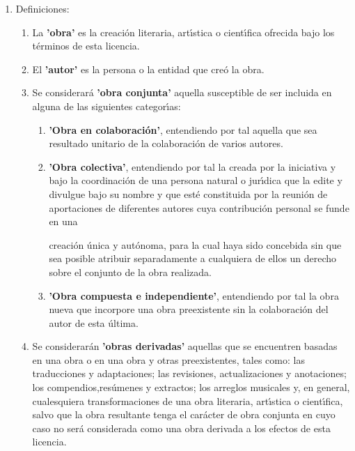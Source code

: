 \begin{enumerate}

\item Definiciones:

  \begin{enumerate}

  \item La \textbf{'obra'} es la creaci\'on literaria, art\'\i{}stica
    o cient\'\i{}fica ofrecida bajo los t\'erminos de esta licencia.

  \item El \textbf{'autor'} es la persona o la entidad que cre\'o la
    obra.

  \item Se considerar\'a \textbf{'obra conjunta'} aquella susceptible
    de ser incluida en alguna de las siguientes categor\'\i{}as:

    \begin{enumerate}

    \item \textbf{'Obra en colaboraci\'on'}, entendiendo por tal
      aquella que sea resultado unitario de la colaboraci\'on de
      varios autores.

    \item \textbf{'Obra colectiva'}, entendiendo por tal la creada por
      la iniciativa y bajo la coordinaci\'on de una persona natural o
      jur\'\i{}dica que la edite y divulgue bajo su nombre y que
      est\'e constituida por la reuni\'on de aportaciones de
      diferentes autores cuya contribuci\'on personal se funde en una

      creaci\'on \'unica y aut\'onoma, para la cual haya sido
      concebida sin que sea posible atribuir separadamente a
      cualquiera de ellos un derecho sobre el conjunto de la obra
      realizada.

    \item \textbf{'Obra compuesta e independiente'}, entendiendo por
      tal la obra nueva que incorpore una obra preexistente sin la
      colaboraci\'on del autor de esta \'ultima.

    \end{enumerate}

  \item Se considerar\'an \textbf{'obras derivadas'} aquellas que se
    encuentren basadas en una obra o en una obra y otras
    preexistentes, tales como: las traducciones y adaptaciones; las
    revisiones, actualizaciones y anotaciones; los
    compendios,res\'umenes y extractos; los arreglos musicales y, en
    general, cualesquiera transformaciones de una obra literaria,
    art\'\i{}stica o cient\'\i{}fica, salvo que la obra resultante
    tenga el car\'acter de obra conjunta en cuyo caso no ser\'a
    considerada como una obra derivada a los efectos de esta licencia.


\end{enumerate}
\end{enumerate}
